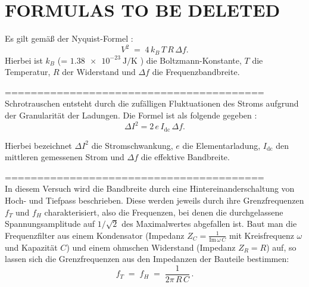 \chapter{FORMULAS TO BE DELETED}
Es gilt gemäß der Nyquist-Formel \cite{artofelectronics}:
\begin{equation}
  V^2 \;=\; 4\,k_B\,T\,R\,\Delta f. 
\end{equation}
Hierbei ist $k_B$ (= $\SI{1.38e-23}{\joule\per\kelvin}$ \cite{codata}) die Boltzmann-Konstante, $T$ die Temperatur, $R$ der Widerstand und $\Delta f$ die Frequenzbandbreite. 


========================================\\
Schrotrauschen entsteht durch die zufälligen Fluktuationen des Stroms aufgrund der Granularität der Ladungen. 
Die Formel ist als folgende gegeben \cite{artofelectronics}:
\begin{equation}
  \Delta I^2 = 2\,e\,I_{\mathrm{dc}}\,\Delta f.
\end{equation}

Hierbei bezeichnet $\Delta I^2$ die Stromschwankung, $e$ die Elementarladung, $I_{\mathrm{dc}}$ den mittleren gemessenen Strom und $\Delta f$ die effektive Bandbreite.


========================================\\
In diesem Versuch wird die Bandbreite durch eine Hintereinanderschaltung von Hoch- und Tiefpass beschrieben. Diese werden jeweils durch ihre Grenzfrequenzen $f_T$ und $f_H$ charakterisiert, also die Frequenzen, bei denen die durchgelassene Spannungsamplitude auf $1/\sqrt{2}$ des Maximalwertes abgefallen ist. Baut man die Frequenzfilter aus einem Kondensator (Impedanz $Z_C = \tfrac{1}{\mathrm{Im}\,\omega\,C}$ mit Kreisfrequenz $\omega$ und Kapazität $C$) und einem ohmschen Widerstand (Impedanz $Z_R = R$) auf, so lassen sich die Grenzfrequenzen aus den Impedanzen der Bauteile bestimmen:
\begin{equation}
  f_T \;=\; f_H \;=\; \frac{1}{2\pi\,R\,C}\,.
\end{equation}


